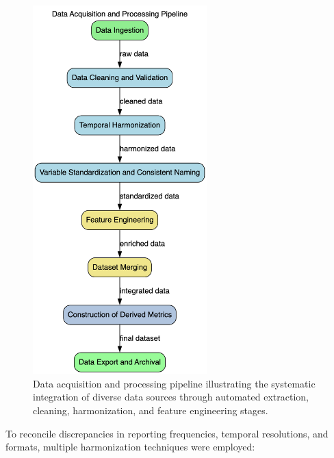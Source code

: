 \begin{figure}[htbp]
\centering
\includegraphics[width=0.6\textwidth]{images/dataacq.png}
\caption{Data acquisition and processing pipeline illustrating the systematic integration of diverse data sources through automated extraction, cleaning, harmonization, and feature engineering stages.}
\label{fig:data_pipeline}
\end{figure}

To reconcile discrepancies in reporting frequencies, temporal resolutions, and formats, multiple harmonization techniques were employed:

